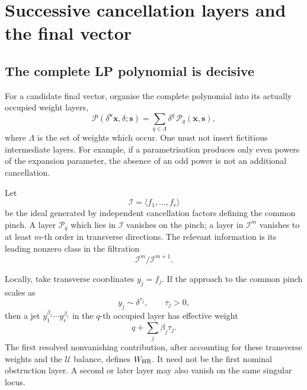 \documentclass[a4paper,11pt]{article}
\newcommand{\x}{\boldsymbol{x}}
\newcommand{\s}{\boldsymbol{s}}
\newcommand{\WHR}{W_{\rm HR}}
\newcommand{\ideal}{\mathcal I}
\begin{document}
\section{Successive cancellation layers and the final vector}
\label{sec:layers}

\subsection{The complete LP polynomial is decisive}

For a candidate final vector, organise the complete polynomial into its
actually occupied weight layers,
\begin{equation}
 \mathcal P(\delta^{\boldsymbol v}\x,\delta;\s)
 =
 \sum_{q\in\Lambda}
 \delta^q\,\mathcal P_q(\x,\s),
\label{eq:weightlayers}
\end{equation}
where \(\Lambda\) is the set of weights which occur.  One must not insert
fictitious intermediate layers.  For example, if a parametrisation produces
only even powers of the expansion parameter, the absence of an odd power is
not an additional cancellation.

Let
\begin{equation}
 \ideal=\langle f_1,\ldots,f_r\rangle
\label{eq:pinchideal}
\end{equation}
be the ideal generated by independent cancellation factors defining the
common pinch.  A layer \(\mathcal P_q\) which lies in \(\ideal\) vanishes on
the pinch; a layer in \(\ideal^m\) vanishes to at least \(m\)-th order in
transverse directions.  The relevant information is its leading nonzero
class in the filtration
\begin{equation}
 \ideal^m/\ideal^{m+1}.
\label{eq:Iadic}
\end{equation}

Locally, take transverse coordinates \(y_j=f_j\).  If the approach to the
common pinch scales as
\begin{equation}
 y_j\sim\delta^{\tau_j},
 \qquad \tau_j>0,
\label{eq:transverseweights}
\end{equation}
then a jet \(y_1^{\beta_1}\cdots y_r^{\beta_r}\) in the \(q\)-th occupied
layer has effective weight
\begin{equation}
 q+\sum_j\beta_j\tau_j.
\label{eq:effectiveweight}
\end{equation}
The first resolved nonvanishing contribution, after accounting for these
transverse weights and the \(\mathcal U\) balance, defines \(\WHR\).  It need
not be the first nominal obstruction layer.  A second or later layer may
also vanish on the same singular locus.
\end{document}
